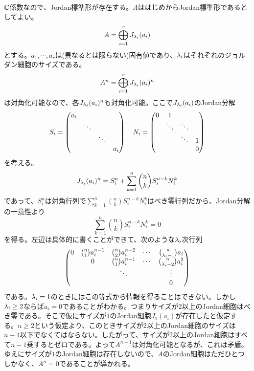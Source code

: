 \begin{sol}
${\mathbb C}$係数なので、Jordan標準形が存在する。$A$ははじめからJordan標準形であるとしてよい。
\[
A = \bigoplus_{i=1}^r J_{{\lambda}_i}(a_i)
\]
とする。$a_1, \cdots , a_r$は(異なるとは限らない)固有値であり、${\lambda}_i$はそれぞれのジョルダン細胞のサイズである。
\[
A^n = \bigoplus_{i=1}^r J_{{\lambda}_i}(a_i)^n
\]
は対角化可能なので、各$J_{{\lambda}_i}(a_i)^n$も対角化可能。ここで$J_{{\lambda}_i}(a_i)$のJordan分解
\[
S_i = \begin{pmatrix} a_i &  & &  \\  &  \ddots & &  \\ & & \ddots & \\ &  & & a_i \end{pmatrix} \quad N_i = \begin{pmatrix} 0 & 1 & & \\ & \ddots & \ddots & \\ & & \ddots & 1 \\ & & & 0  \end{pmatrix}
\]
を考える。
\[
J_{{\lambda}_i}(a_i)^n = S_i^n + \sum_{k=1}^n \binom{n}{k} S_i^{n-k} N_i^k
\]
であって、$S_i^n$は対角行列で$\sum_{k=1}^n \binom{n}{k} S_i^{n-k} N_i^k$はべき零行列だから、Jordan分解の一意性より
\[
\sum_{k=1}^n \binom{n}{k} S_i^{n-k} N_i^k = 0
\]
を得る。左辺は具体的に書くことができて、次のような${\lambda}_i$次行列
\[
\begin{pmatrix} 
0 & \binom{n}{1} a_i^{n-1} & \binom{n}{2} a_i^{n-2} & \cdots & \binom{n}{{\lambda}_i - 1} a_i \\
  & 0 & \binom{n}{1} a_i^{n-1} & \cdots & \binom{n}{{\lambda}_i - 2} a_i^2 \\
  &   &  \ddots &  & \vdots \\
  &   &        &  &  0
 \end{pmatrix}
\]
である。${\lambda}_i = 1$のときにはこの等式から情報を得ることはできない。しかし${\lambda}_i \geq 2$ならば$a_i = 0$であることがわかる。つまりサイズが$2$以上のJordan細胞はべき零である。そこで仮にサイズが$1$のJordan細胞$J_1(a_i)$が存在したと仮定する。$n \geq 2$という仮定より、このときサイズが$2$以上のJordan細胞のサイズは$n-1$以下でなくてはならない。したがって、サイズが$2$以上のJordan細胞はすべて$n-1$乗するとゼロである。よって$A^{n-1}$は対角化可能となるが、これは矛盾。ゆえにサイズが$1$のJordan細胞は存在しないので、$A$のJordan細胞はただひとつしかなく、$A^n=0$であることが導かれる。
\end{sol}

\newpage

